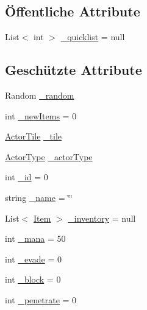 \subsection*{Öffentliche Attribute}
\begin{DoxyCompactItemize}
\item 
List$<$ int $>$ \hyperlink{class_gruppe22_1_1_backend_1_1_actor_a82d6e523cc6a9f60302a8208d0636f37}{\-\_\-quicklist} = null
\end{DoxyCompactItemize}
\subsection*{Geschützte Attribute}
\begin{DoxyCompactItemize}
\item 
Random \hyperlink{class_gruppe22_1_1_backend_1_1_actor_a4080b008472d54be9578f0e5fafde8fd}{\-\_\-random}
\item 
int \hyperlink{class_gruppe22_1_1_backend_1_1_actor_a97f8959538541fb8fb2a1f1a51ed37af}{\-\_\-new\-Items} = 0
\item 
\hyperlink{class_gruppe22_1_1_backend_1_1_actor_tile}{Actor\-Tile} \hyperlink{class_gruppe22_1_1_backend_1_1_actor_aa18bcd4363b23f8a4eef003ee26a830f}{\-\_\-tile}
\item 
\hyperlink{namespace_gruppe22_1_1_backend_a56d8f7bd1b5ba29d421c27a959523af3}{Actor\-Type} \hyperlink{class_gruppe22_1_1_backend_1_1_actor_a00cc8cd745cd8b3e25e7114cbd4a2073}{\-\_\-actor\-Type}
\item 
int \hyperlink{class_gruppe22_1_1_backend_1_1_actor_a5ce8fbbf6e837f50fd73dde0b8727441}{\-\_\-id} = 0
\item 
string \hyperlink{class_gruppe22_1_1_backend_1_1_actor_abe357b249386e48968f23fe0440e6828}{\-\_\-name} = \char`\"{}\char`\"{}
\item 
List$<$ \hyperlink{class_gruppe22_1_1_backend_1_1_item}{Item} $>$ \hyperlink{class_gruppe22_1_1_backend_1_1_actor_ad20845ea7fd5ae4ffaefa5b5c3ce485a}{\-\_\-inventory} = null
\item 
int \hyperlink{class_gruppe22_1_1_backend_1_1_actor_a9ed1576fe639441364e86d1e38f124ea}{\-\_\-mana} = 50
\item 
int \hyperlink{class_gruppe22_1_1_backend_1_1_actor_a06c3f8a3312eb5e80e5b8e01de17ca18}{\-\_\-evade} = 0
\item 
int \hyperlink{class_gruppe22_1_1_backend_1_1_actor_a9948c30b99e0f88c1b68515cfdbdcdfe}{\-\_\-block} = 0
\item 
int \hyperlink{class_gruppe22_1_1_backend_1_1_actor_ae39864b12f85addfa4efab1544cf8c1c}{\-\_\-penetrate} = 0

\end{DoxyCompactItemize}
